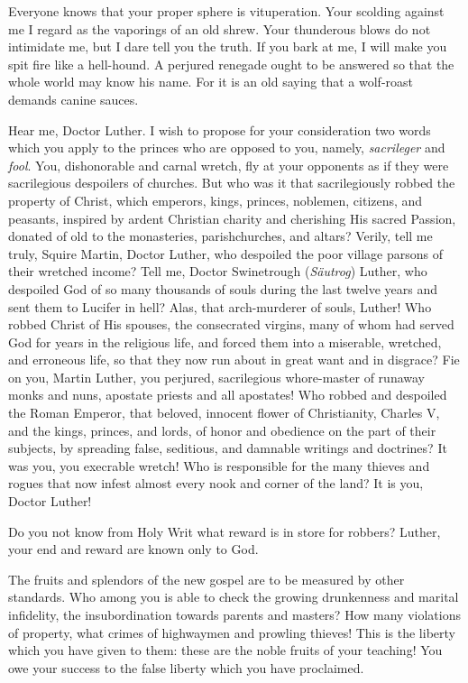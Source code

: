 Everyone knows that your proper sphere is vituperation. Your scolding
against me I regard as the vaporings of an old shrew. Your thunderous blows
do not intimidate me, but I dare tell you the truth. If you bark at me, I
will make you spit fire like a hell-hound. A perjured renegade ought to be
answered so that the whole world may know his name. For it is an old
saying that a wolf-roast demands canine sauces.

Hear me, Doctor Luther. I wish to propose for your consideration two
words which you apply to the princes who are opposed to you, namely, \textit{sacrileger}
and \textit{fool}. You, dishonorable and carnal wretch, fly at your opponents
as if they were sacrilegious despoilers of churches. But who was it that
sacrilegiously robbed the property of Christ, which emperors, kings, princes,
noblemen, citizens, and peasants, inspired by ardent Christian charity and
cherishing His sacred Passion, donated of old to the monasteries, parishchurches,
and altars? Verily, tell me truly, Squire Martin, Doctor Luther,
who despoiled the poor village parsons of their wretched income? Tell me,
Doctor Swinetrough (\textit{Säutrog}) Luther, who despoiled God of so many thousands
of souls during the last twelve years and sent them to Lucifer in hell?
Alas, that arch-murderer of souls, Luther! Who robbed Christ of His spouses,
the consecrated virgins, many of whom had served God for years in the
religious life, and forced them into a miserable, wretched, and erroneous life,
so that they now run about in great want and in disgrace? Fie on you,
Martin Luther, you perjured, sacrilegious whore-master of runaway monks
and nuns, apostate priests and all apostates! Who robbed and despoiled the
Roman Emperor, that beloved, innocent flower of Christianity, Charles V,
and the kings, princes, and lords, of honor and obedience on the part of their
subjects, by spreading false, seditious, and damnable writings and doctrines?
It was you, you execrable wretch! Who is responsible for the many thieves
and rogues that now infest almost every nook and corner of the land? It is
you, Doctor Luther!

Do you not know from Holy Writ what reward is in store for robbers?
Luther, your end and reward are known only to God.

The fruits and splendors of the new gospel are to be measured by other
standards. Who among you is able to check the growing drunkenness and
marital infidelity, the insubordination towards parents and masters? How
many violations of property, what crimes of highwaymen and prowling
thieves! This is the liberty which you have given to them: these are the
noble fruits of your teaching! You owe your success to the false liberty
which you have proclaimed.

